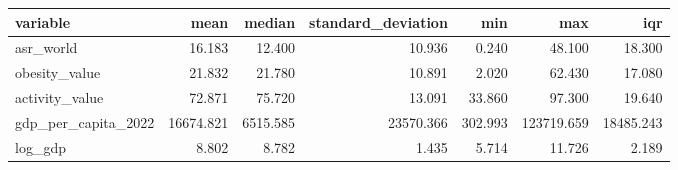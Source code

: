 \begin{tabular}{lrrrrrr}
\toprule
           variable &      mean &   median &  standard\_deviation &     min &        max &       iqr \\
\midrule
          asr\_world &    16.183 &   12.400 &              10.936 &   0.240 &     48.100 &    18.300 \\
      obesity\_value &    21.832 &   21.780 &              10.891 &   2.020 &     62.430 &    17.080 \\
     activity\_value &    72.871 &   75.720 &              13.091 &  33.860 &     97.300 &    19.640 \\
gdp\_per\_capita\_2022 & 16674.821 & 6515.585 &           23570.366 & 302.993 & 123719.659 & 18485.243 \\
            log\_gdp &     8.802 &    8.782 &               1.435 &   5.714 &     11.726 &     2.189 \\
\bottomrule
\end{tabular}
